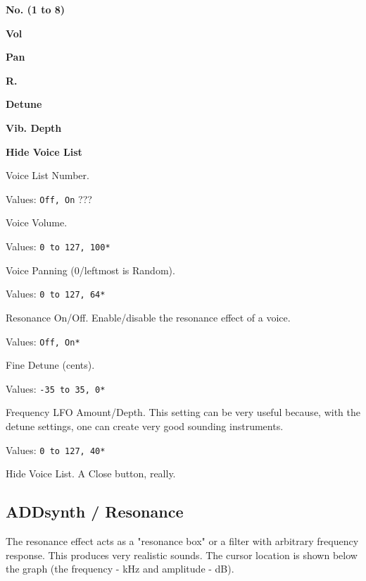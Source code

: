    \begin{enumber}
      \item \textbf{No. (1 to 8)}
      \item \textbf{Vol}
      \item \textbf{Pan}
      \item \textbf{R.}
      \item \textbf{Detune}
      \item \textbf{Vib. Depth}
      \item \textbf{Hide Voice List}
   \end{enumber}

   \setcounter{ItemCounter}{0}      %

   Voice List Number.

   Values: \texttt{Off, On} ???

   Voice Volume.

   Values: \texttt{0 to 127, 100*}

   Voice Panning (0/leftmost is Random).

   Values: \texttt{0 to 127, 64*}

   Resonance On/Off.
   Enable/disable the resonance effect of a voice.

   Values: \texttt{Off, On*}

   Fine Detune (cents).

   Values: \texttt{-35 to 35, 0*}

   Frequency LFO Amount/Depth.
   This setting can be very useful because, with the detune settings, one can
   create very good sounding instruments. 

   Values: \texttt{0 to 127, 40*}

   Hide Voice List.  A Close button, really.

\subsection{ADDsynth / Resonance}
\label{subsec:addsynth_resonance}

   The resonance effect acts as a "resonance box" or a filter with arbitrary
   frequency response. This produces very realistic sounds. 
   The cursor location is shown below the graph (the frequency - kHz and
   amplitude - dB). 

